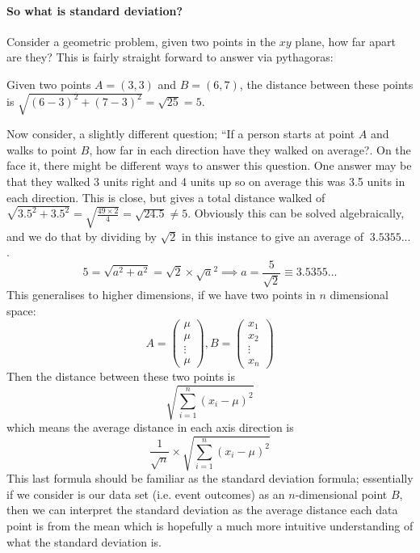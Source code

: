 \documentclass[../../Axiomathic.tex]{subfiles}
\begin{document}
\paragraph{So what is standard deviation?}
Consider a geometric problem, given two points in the $xy$ plane, how far apart are they? This is fairly straight forward to answer via pythagoras:
\begin{example}
Given two points $A=(3,3)$ and $B=(6,7)$, the distance between these points is $\sqrt{(6-3)^2+(7-3)^2}=\sqrt{25}=5$.
\end{example}
Now consider, a slightly different question; ``If a person starts at point $A$ and walks to point $B$, how far in each direction have they walked on average?. On the face it, there might be different ways to answer this question. One answer may be that they walked 3 units right and 4 units up so on average this was 3.5 units in each direction. This is close, but gives a total distance walked of $\sqrt{3.5^2+3.5^2}=\sqrt{\frac{49\times 2}{4}}= \sqrt{24.5} \neq 5$. Obviously this can be solved algebraically, and we do that by dividing by $\sqrt 2$ in this instance to give an average of $\ 3.5355...$. 
\[5=\sqrt{a^2+a^2}=\sqrt 2 \times \sqrt a^2 \implies a =\frac{5}{\sqrt 2} \equiv 3.5355...\]
This generalises to higher dimensions, if we have two points in $n$ dimensional space:
\[A =\begin{pmatrix} \mu \\ \mu \\ \vdots \\ \mu \end{pmatrix}, B=\begin{pmatrix} x_1 \\ x_2 \\ \vdots \\ x_n \end{pmatrix} \]
Then the distance between these two points is \[\sqrt{ \sum_{i=1}^{n}(x_i-\mu)^2} \] which means the average distance in each axis direction is \[ \frac{1}{\sqrt n} \times \sqrt{ \sum_{i=1}^{n}(x_i-\mu)^2}\]
This last formula should be familiar as the standard deviation formula; essentially if we consider is our data set (i.e. event outcomes) as an $n$-dimensional point $B$, then we can interpret the standard deviation as the average distance each data point is from the mean which is hopefully a much more intuitive understanding of what the standard deviation is. 
\end{document}
